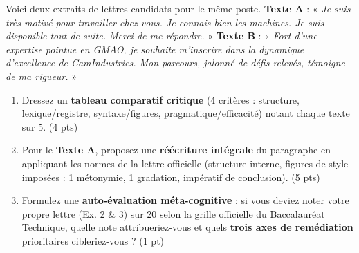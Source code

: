\documentclass[11pt]{article}
\begin{document}
\begin{exercice}
Voici deux extraits de lettres candidats pour le même poste. \textbf{Texte A} : « \textit{Je suis très motivé pour travailler chez vous. Je connais bien les machines. Je suis disponible tout de suite. Merci de me répondre. }» \textbf{Texte B} : « \textit{Fort d'une expertise pointue en GMAO, je souhaite m'inscrire dans la dynamique d'excellence de CamIndustries. Mon parcours, jalonné de défis relevés, témoigne de ma rigueur. }»
\begin{enumerate}
    \item Dressez un \textbf{tableau comparatif critique} (4 critères : structure, lexique/registre, syntaxe/figures, pragmatique/efficacité) notant chaque texte sur 5. (4 pts)
    \item Pour le \textbf{Texte A}, proposez une \textbf{réécriture intégrale} du paragraphe en appliquant les normes de la lettre officielle (structure interne, figures de style imposées : 1 métonymie, 1 gradation, impératif de conclusion). (5 pts)
    \item Formulez une \textbf{auto-évaluation méta-cognitive} : si vous deviez noter votre propre lettre (Ex. 2 \& 3) sur 20 selon la grille officielle du Baccalauréat Technique, quelle note attribueriez-vous et quels \textbf{trois axes de remédiation} prioritaires cibleriez-vous ? (1 pt)
\end{enumerate}
\end{exercice}
\end{document}
